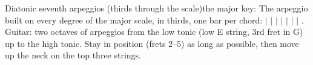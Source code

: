 \begin{patternbox}{Diatonic seventh arpeggios (thirds through the scale)}{the major key:       }
The arpeggio  built on every degree of the major scale, in thirds,
one bar per chord:
 $|$  $|$  $|$  $|$
 $|$  $|$  $|$ .
Guitar: two octaves of arpeggios from the low tonic (low E string, 3rd fret in G) up
to the high tonic. Stay in position (frets 2--5) as long as possible, then move up the
neck on the top three strings.
\patternwhereline
\end{patternbox}
